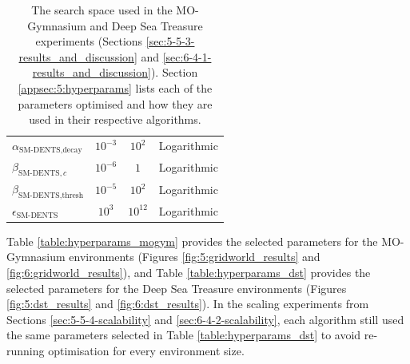 \begin{table}[tbp]
\begin{tabular}{l|c|c|c}
            $\alpha_{\text{SM-DENTS},\text{decay}}$ & $10^{-3}$     & $10^2$    & Logarithmic \\
            $\beta_{\text{SM-DENTS},c}$             & $10^{-6}$     & $1$       & Logarithmic \\
            $\beta_{\text{SM-DENTS},\text{thresh}}$ & $10^{-5}$     & $10^2$    & Logarithmic \\
            $\epsilon_{\text{SM-DENTS}}$            & $10^{3}$      & $10^{12}$ & Logarithmic
        \end{tabular}
        \caption[The  search space used in the MO-Gymnasium and Deep Sea Treasure experiments (Sections \ref{sec:5-5-3-results_and_discussion} and \ref{sec:6-4-1-results_and_discussion}).]{The  search space used in the MO-Gymnasium and Deep Sea Treasure experiments (Sections \ref{sec:5-5-3-results_and_discussion} and \ref{sec:6-4-1-results_and_discussion}). Section \ref{appsec:5:hyperparams} lists each of the parameters optimised and how they are used in their respective algorithms. \label{table:mo_hps_space}}
    \end{table}
    
    Table \ref{table:hyperparams_mogym} provides the selected parameters for the MO-Gymnasium environments (Figures \ref{fig:5:gridworld_results} and \ref{fig:6:gridworld_results}), and Table \ref{table:hyperparams_dst} provides the selected parameters for the Deep Sea Treasure environments (Figures \ref{fig:5:dst_results} and \ref{fig:6:dst_results}). In the scaling experiments from Sections \ref{sec:5-5-4-scalability} and \ref{sec:6-4-2-scalability}, each algorithm still used the same parameters selected in Table \ref{table:hyperparams_dst} to avoid re-running optimisation for every environment size.


